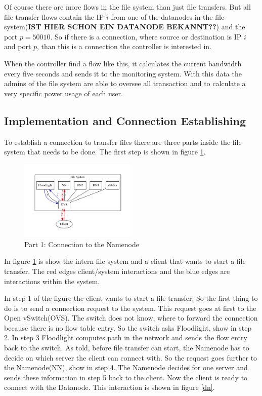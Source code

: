  Of course there are more flows in the file system than just file transfers. But all file transfer flows contain the IP $i$ from one of the datanodes in the file system(\textbf{IST HIER SCHON EIN DATANODE BEKANNT??}) and the port $p=50010$. So if there is a connection, where source or destination is IP $i$ and port $p$, than this is a connection the controller is interested in.
 
 When the controller find a flow like this, it calculates the current bandwidth every five seconds and sends it to the monitoring system. With this data the admins of the file system are able to oversee all transaction and to calculate a very specific power usage of each user. 
 
 \subsection{Implementation and Connection Establishing}               

To establish a connection to transfer files there are three parts inside the file system that needs to be done. The first step is shown in figure \ref{nn}.
 
\begin{figure}[ht]
\centering
\includegraphics[width=0.5\textwidth]{img/connectionToNamenode} 
\caption{Part 1: Connection to the Namenode}
\label{nn}
\end{figure}

In figure \ref{nn} is show the intern file system and a client that wants to start a file transfer. The red edges client/system interactions and the blue edges are interactions within the system.

In step 1 of the figure the client wants to start a file transfer. So the first thing to do is to send a connection request to the system. This request goes at first to the Open vSwitch(OVS). The switch does not know, where to forward the connection because there is no flow table entry. So the switch asks Floodlight, show in step 2. In step 3 Floodlight computes path in the network and sends the flow entry back to the switch. As told, before file transfer can start, the Namenode has to decide on which server the client can connect with. So the request goes further to the Namenode(NN), show in step 4. The Namenode decides for one server and sends these information in step 5 back to the client. Now the client is ready to connect with the Datanode. This interaction is shown in figure \ref{dn}.

